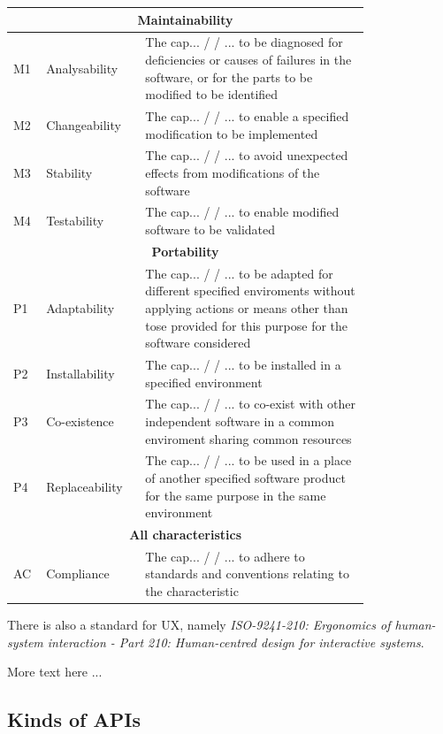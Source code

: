 \documentclass{article}
\begin{document}
\begin{table}[H]
\centering
\begin{tabular}{|p{0.05\linewidth}|p{0.2\linewidth}|p{0.55\linewidth}|}
\hline
\multicolumn{3}{c}{\textbf{Maintainability}} \\ \hline
M1&Analysability & The cap... / / ... to be diagnosed for deficiencies or causes of failures in the
software, or for the parts to be modified to be identified \\ \hline
M2&Changeability & The cap... / / ... to enable a specified modification to be implemented \\ \hline
M3&Stability & The cap... / / ... to avoid unexpected effects from modifications of the software \\ \hline
M4&Testability &The cap... / / ... to enable modified software to be validated \\ \hline

\multicolumn{3}{c}{\textbf{Portability}} \\ \hline
P1& Adaptability &The cap... / / ... to be adapted for different specified enviroments without applying
actions or means other than tose provided for this purpose for the software considered \\ \hline
P2&Installability& The cap... / / ... to be installed in a specified environment \\ \hline
P3&Co-existence &The cap... / / ... to co-exist with other independent software in a common enviroment sharing
common resources \\ \hline
P4&Replaceability &The cap... / / ... to be used in a place of another specified software product for the same
purpose in the same environment \\ \hline

\multicolumn{3}{c}{\textbf{All characteristics}} \\ \hline
AC&Compliance & The cap... / / ... to adhere to standards and conventions relating to the
characteristic \\ \hline
\end{tabular}
\end{table}


There is also a standard for UX,
namely \textit{ISO-9241-210: Ergonomics of human-system interaction -
Part 210: Human-centred design for interactive systems}.

More text here ...
\subsection{Kinds of APIs}
\end{document}
